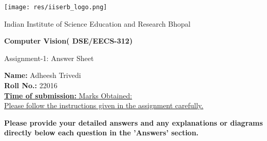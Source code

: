 \documentclass[12pt, a4paper]{exam}
\begin{document}
	\noindent
	\begin{minipage}[l]{0.1\textwidth}
		\noindent
		\texttt{[image: res/iiserb\_logo.png]}
	\end{minipage}
\hfill
\begin{minipage}[c]{0.8\textwidth}
	\begin{center}
		{\large	Indian Institute of Science Education and Research Bhopal \par
		\large	\par
	\large \textbf{	Computer Vision( DSE/EECS-312)}	\par
\small	Assignment-1: Answer Sheet}
	\end{center}
\end{minipage}

\par
\vspace{0.2in}
\noindent
\textbf{Name: }Adheesh Trivedi\\
\noindent
\textbf{Roll No.:  }22016\\
\noindent
\uline{\textbf{Time of submission: } \hfill 		\hfill Marks Obtained: } \\
\uline{Please follow the instructions given in the assignment carefully. \hfill}
\par 
\vspace{0.15in}
\noindent
\centering
{\small \bfseries  Please provide your detailed answers and any explanations or diagrams directly below each question in the 'Answers' section. }
\end{document}
